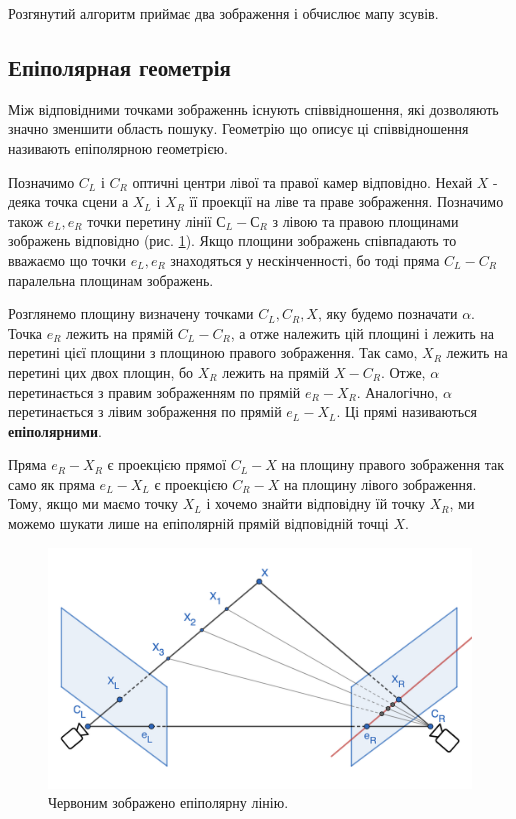 \documentclass{article}
\theoremstyle{definition}
\begin{document}
Розгянутий алгоритм приймає два зображення і обчислює мапу зсувів.

\subsection{Епіполярная геометрія}
Між відповідними точками зображеннь існують співвідношення, які дозволяють значно зменшити область пошуку. Геометрію що описує ці співвідношення називають епіполярною геометрією. 

Позначимо $C_L$ і $C_R$ оптичні центри лівої та правої камер відповідно. Нехай $X$ - деяка точка сцени а $X_L$ і $X_R$ її проекції на ліве та праве зображення. Позначимо також $e_L, e_R$ точки перетину лінії $С_L-С_R$ з лівою та правою площинами зображень відповідно (рис. \ref{fig:epipolar_geometry}). Якщо площини зображень співпадають то вважаємо що точки $e_L, e_R$ знаходяться у нескінченності, бо тоді пряма $C_L-C_R$ паралельна площинам зображень.

Розглянемо площину визначену точками $C_L, C_R, X$, яку будемо позначати $\alpha$. Точка $e_R$ лежить на прямій $C_L-C_R$, а отже належить цій площині і лежить на перетині цієї площини з площиною правого зображення. Так само, $X_R$ лежить на перетині цих двох площин, бо $X_R$ лежить на прямій $X-C_R$. Отже, $\alpha$ перетинається з правим зображенням по прямій $e_R-X_R$. Аналогічно, $\alpha$ перетинається з лівим зображення по прямій $e_L-X_L$. Ці прямі називаються \textbf{епіполярними}.

Пряма $e_R-X_R$ є проекцією прямої $C_L-X$ на площину правого зображення так само як пряма $e_L-X_L$ є проекцією $C_R-X$ на площину лівого зображення. Тому, якщо ми маємо точку $X_L$ і хочемо знайти відповідну їй точку $X_R$, ми можемо шукати лише на епіполярній прямій відповідній точці $X$.

\begin{figure}[h]
	\includegraphics[width=0.7\linewidth]{epipolar_geometry}
	\centering
	\caption{Червоним зображено епіполярну лінію.}
	\label{fig:epipolar_geometry}
\end{figure}
\end{document}
